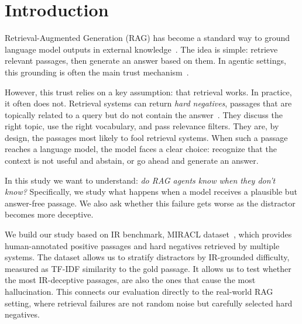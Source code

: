 \documentclass[sigconf,review,anonymous]{acmart}
\begin{document}


\maketitle

\section{Introduction}

Retrieval-Augmented Generation (RAG) has become a standard way to ground language model outputs in external knowledge~\cite{lewis2020rag}. 
The idea is simple: retrieve relevant passages, then generate an answer based on them. In agentic settings, this grounding is often the main trust mechanism~\cite{INSERT}.

However, this trust relies on a key assumption: that retrieval works. 
In practice, it often does not. Retrieval systems can return \textit{hard negatives}, passages that are topically related to a query but do not contain the answer~\cite{thakur2021beir,karpukhin2020dpr}. 
They discuss the right topic, use the right vocabulary, and pass relevance filters. They are, by design, the passages most likely to fool retrieval systems. 
When such a passage reaches a language model, the model faces a clear choice: recognize that the context is not useful and abstain, or go ahead and generate an answer.

In this study we want to understand: \textit{do RAG agents know when they don't know?} 
Specifically, we study what happens when a model receives a plausible but answer-free passage. 
We also ask whether this failure gets worse as the distractor becomes more deceptive.

We build our study based on IR benchmark, MIRACL dataset~\cite{zhang2023miracl}, which provides human-annotated positive passages and hard negatives retrieved by multiple systems.
The dataset allows us to stratify distractors by IR-grounded difficulty, measured as TF-IDF similarity to the gold passage.
It allows us to test whether the most IR-deceptive passages, are also the ones that cause the most hallucination. 
This connects our evaluation directly to the real-world RAG setting, where retrieval failures are not random noise but carefully selected hard negatives.
\end{document}
